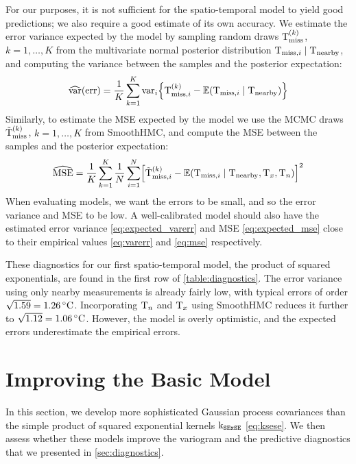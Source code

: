 \documentclass[12pt]{article}
\begin{document}
For our purposes, it is not sufficient for the spatio-temporal model to yield good predictions; we also require a good estimate of its own accuracy.
We estimate the error variance expected by the model by sampling random draws \(\mathrm{T}^{(k)}_{\mathrm{miss}}\), \(k=1,\dotsc,K\) from the multivariate normal posterior distribution \(\mathrm{T}_{\mathrm{miss},i} \mid \mathrm{T}_{\mathrm{nearby}}\), and computing the variance between the samples and the posterior expectation:
\begin{equation}
\widehat{\var}\del{\error} = \frac{1}{K} \sum_{k=1}^K \var_i \cbr{\T^{(k)}_{\miss,i} - \E\del{\T_{\miss,i} \mid \T_\obs}}
\label{eq:expected_varerr}
\end{equation}
Similarly, to estimate the MSE expected by the model we use the MCMC draws \(\tilde{\mathrm{T}}^{(k)}_{\mathrm{miss}}\), \(k=1,\dotsc,K\) from SmoothHMC, and compute the MSE between the samples and the posterior expectation:
\begin{equation}
    \widehat{\mse} = \frac{1}{K} \sum_{k=1}^K \frac{1}{N} \sum_{i=1}^N \sbr{\tilde\T^{(k)}_{\miss,i} - \E\del{\T_{\miss,i} \mid \T_\obs,\Tx,\Tn}}^2
\label{eq:expected_mse}
\end{equation}
When evaluating models, we want the errors to be small, and so the error variance and MSE to be low. 
A well-calibrated model should also have the estimated error variance \autoref{eq:expected_varerr} and MSE \autoref{eq:expected_mse} close to their empirical values \autoref{eq:varerr} and \autoref{eq:mse} respectively.

These diagnostics for our first spatio-temporal model, the product of squared exponentials, are found in the first row of \autoref{table:diagnostics}. The error variance using only nearby measurements is already fairly low, with typical errors of order \(\sqrt{1.59}=1.26\,{}^{\circ}\mathrm{C}\). Incorporating \(\mathrm{T}_{n}\) and \(\mathrm{T}_{x}\) using SmoothHMC reduces it further to \(\sqrt{1.12}=1.06\,{}^{\circ}\mathrm{C}\). 
However, the model is overly optimistic, and the expected errors underestimate the empirical errors.

\section{Improving the Basic Model}
\label{sec:improving_model}

In this section, we develop more sophisticated Gaussian process covariances than the simple product of squared exponential kernels \(\operatorname{k_{\mathtt{SExSE}}}\) \autoref{eq:ksese}. 
We then assess whether these models improve the variogram and the predictive diagnostics that we presented in \autoref{sec:diagnostics}.
\end{document}
